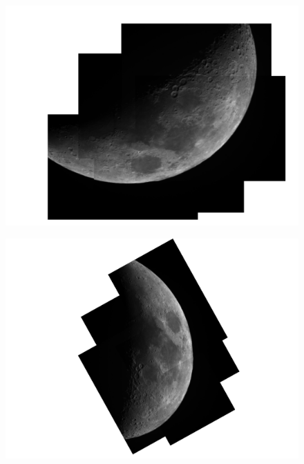 \documentclass[12pt]{article}%
\begin{document}
\begin{figure}[htb!]
\center
\includegraphics[width=15cm]{moon_mosaic.pdf}
\end{figure}

\begin{figure}[htb!]
\center
\includegraphics[width=15cm]{moon_mosaic_rotated.pdf}
\end{figure}
\end{document}
